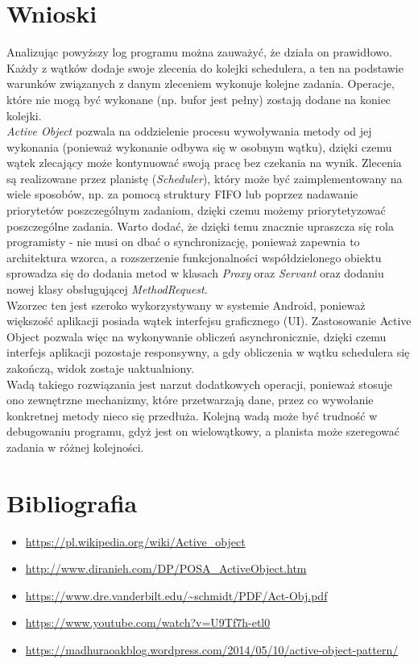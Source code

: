 \documentclass[12pt]{article}
\begin{document}
\section{Wnioski}
Analizując powyższy log programu można zauważyć, że działa on prawidłowo. Każdy z wątków dodaje swoje zlecenia do kolejki schedulera, a ten na podstawie warunków związanych z danym zleceniem wykonuje kolejne zadania. Operacje, które nie mogą być wykonane (np. bufor jest pełny) zostają dodane na koniec kolejki. \\

\emph{Active Object} pozwala na oddzielenie procesu wywoływania metody od jej wykonania (ponieważ wykonanie odbywa się w osobnym wątku), dzięki czemu wątek zlecający może kontynuować swoją pracę bez czekania na wynik. Zlecenia są realizowane przez planistę (\emph{Scheduler}), który może być zaimplementowany na wiele sposobów, np. za pomocą struktury FIFO lub poprzez nadawanie priorytetów poszczególnym zadaniom, dzięki czemu możemy priorytetyzować poszczególne zadania. Warto dodać, że dzięki temu znacznie upraszcza się rola programisty - nie musi on dbać o synchronizację, ponieważ zapewnia to architektura wzorca, a rozszerzenie funkcjonalności współdzielonego obiektu sprowadza się do dodania metod w klasach \emph{Proxy} oraz \emph{Servant} oraz dodaniu nowej klasy obsługującej \emph{MethodRequest}. \\

Wzorzec ten jest szeroko wykorzystywany w systemie Android, ponieważ większość aplikacji posiada wątek interfejsu graficznego (UI). Zastosowanie Active Object pozwala więc na wykonywanie obliczeń asynchronicznie, dzięki czemu interfejs aplikacji pozostaje responsywny, a gdy obliczenia w wątku schedulera się zakończą, widok zostaje uaktualniony. \\

Wadą takiego rozwiązania jest narzut dodatkowych operacji, ponieważ stosuje ono zewnętrzne mechanizmy, które przetwarzają dane, przez co wywołanie konkretnej metody nieco się przedłuża. Kolejną wadą może być trudność w debugowaniu programu, gdyż jest on wielowątkowy, a planista może szeregować zadania w różnej kolejności.



\newpage
\section{Bibliografia}
\begin{itemize}
    \item \url{https://pl.wikipedia.org/wiki/Active_object}
    \item \url{http://www.diranieh.com/DP/POSA_ActiveObject.htm}
    \item \url{https://www.dre.vanderbilt.edu/~schmidt/PDF/Act-Obj.pdf}
    \item \url{https://www.youtube.com/watch?v=U9Tf7h-etl0}
    \item \url{https://madhuraoakblog.wordpress.com/2014/05/10/active-object-pattern/}


\end{itemize}
\end{document}
